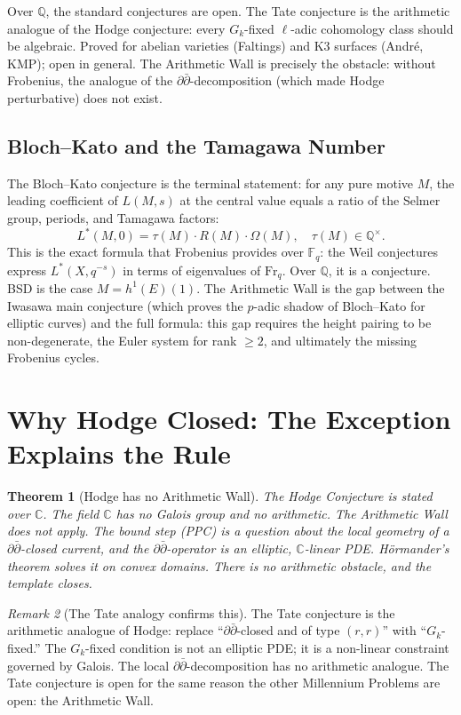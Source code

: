 \documentclass[12pt]{article}
\newtheorem{theorem}{Theorem}
\theoremstyle{definition}
\theoremstyle{remark}
\newtheorem{remark}[theorem]{Remark}
\begin{document}
Over $\mathbb{Q}$, the standard conjectures are open. The Tate conjecture
\cite{tate} is the arithmetic analogue of the Hodge conjecture:
every $G_k$-fixed $\ell$-adic cohomology class should be algebraic.
Proved for abelian varieties (Faltings) and K3 surfaces (André, KMP);
open in general. The Arithmetic Wall is precisely the obstacle: without
Frobenius, the analogue of the $\partial\bar\partial$-decomposition
(which made Hodge perturbative) does not exist.

\subsection{Bloch--Kato and the Tamagawa Number}

The Bloch--Kato conjecture \cite{blochkato} is the terminal statement:
for any pure motive $M$, the leading coefficient of $L(M,s)$ at the
central value equals a ratio of the Selmer group, periods, and Tamagawa factors:
\[
L^*(M, 0) = \tau(M) \cdot R(M) \cdot \Omega(M),
\quad \tau(M) \in \mathbb{Q}^\times.
\]
This is the exact formula that Frobenius provides over $\mathbb{F}_q$:
the Weil conjectures express $L^*(X,q^{-s})$ in terms of eigenvalues of
$\mathrm{Fr}_q$. Over $\mathbb{Q}$, it is a conjecture. BSD is the case
$M = h^1(E)(1)$. The Arithmetic Wall is the gap between the Iwasawa main
conjecture (which proves the $p$-adic shadow of Bloch--Kato for elliptic
curves) and the full formula: this gap requires the height pairing to be
non-degenerate, the Euler system for rank $\geq 2$,
and ultimately the missing Frobenius cycles.

\section{Why Hodge Closed: The Exception Explains the Rule}

\begin{theorem}[Hodge has no Arithmetic Wall]\label{thm:hodgewall}
The Hodge Conjecture is stated over $\mathbb{C}$. The field $\mathbb{C}$
has no Galois group and no arithmetic. The Arithmetic Wall does not apply.
The bound step (PPC) is a question about the local geometry of a
$\partial\bar\partial$-closed current, and the $\partial\bar\partial$-operator
is an elliptic, $\mathbb{C}$-linear PDE. Hörmander's theorem
\cite{hormander} solves it on convex domains. There is no arithmetic
obstacle, and the template closes.
\end{theorem}

\begin{remark}[The Tate analogy confirms this]
The Tate conjecture \cite{tate} is the arithmetic analogue of Hodge:
replace ``$\partial\bar\partial$-closed and of type $(r,r)$'' with
``$G_k$-fixed.'' The $G_k$-fixed condition is not an elliptic PDE;
it is a non-linear constraint governed by Galois. The local
$\partial\bar\partial$-decomposition has no arithmetic analogue.
The Tate conjecture is open for the same reason the other Millennium
Problems are open: the Arithmetic Wall.
\end{remark}
\end{document}
